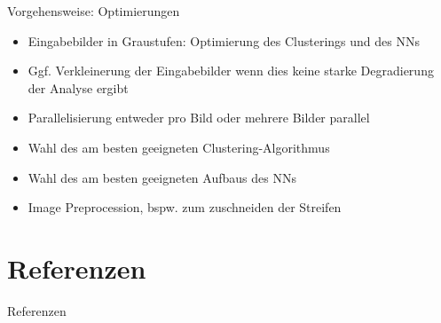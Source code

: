\documentclass[9pt]{beamer}
\begin{document}
\begin{frame}{Vorgehensweise: Optimierungen}
	\begin{itemize}
		\item Eingabebilder in Graustufen: Optimierung des Clusterings und des NNs
		\item Ggf. Verkleinerung der Eingabebilder wenn dies keine starke Degradierung der Analyse ergibt
		\item Parallelisierung entweder pro Bild oder mehrere Bilder parallel
		\item Wahl des am besten geeigneten Clustering-Algorithmus
		\item Wahl des am besten geeigneten Aufbaus des NNs
		\item Image Preprocession, bspw. zum zuschneiden der Streifen
	\end{itemize}
\end{frame}

\section{Referenzen}

\begin{frame}[plain,shrink=40]{Referenzen}
	
	
\end{frame}

	
\end{document}
